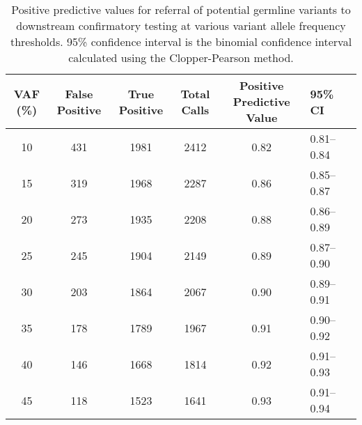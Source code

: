 
\begin{table}[H]
\caption[Positive predictive values for referral of potential germline variants to downstream confirmatory testing at various variant allele frequency thresholds.]{Positive predictive values for referral of potential germline variants to downstream confirmatory testing at various variant allele frequency thresholds. 95\% confidence interval is the binomial confidence interval calculated using the Clopper-Pearson method.}
\label{tbl:ppv}
\centering
      \begin{tabular}{cccccll}
        \hline
        VAF (\%) & False Positive & True Positive & Total Calls & Positive Predictive Value & 95\% CI
        \\
        \hline
        10 & 431 & 1981 & 2412 & 0.82 & 0.81--0.84
        \\
        15 & 319 & 1968 & 2287 & 0.86 & 0.85--0.87
        \\
        20 & 273 & 1935 & 2208 & 0.88 & 0.86--0.89
        \\
        25 & 245 & 1904 & 2149 & 0.89 & 0.87--0.90
        \\
        30 & 203 & 1864 & 2067 & 0.90 & 0.89--0.91
        \\
        35 & 178 & 1789 & 1967 & 0.91 & 0.90--0.92
        \\
        40 & 146 & 1668 & 1814 & 0.92 & 0.91--0.93
        \\
        45 & 118 & 1523 & 1641 & 0.93 & 0.91--0.94
        \\
				\hline
      \end{tabular} \\
\end{table}



\endinput

we were not only able to achieve sensitivity of 0.99, but also a positive predictive value of 0.86. This also meant that approximately 6\% of true germline variants would be overlooked and close to 10\% of calls predicted as potential germline variants would be somatic mutations. The lower bounds of the confidence intervals for sensitivity at VAF cut-offs of 20\%, 25\%, and 30\% were 0.97, 0.95, and 0.93, respectively, whereas the lower bounds of the confidence intervals for PPV were 0.86, 0.87, and 0.89, respectively. By taking into account margins of errors, selecting a VAF threshold of 30\% would provide the best trade-off between sensitivity and PPV. At the 30\% VAF cut-off, we were not only able to achieve sensitivity of 0.94, but also a positive predictive value of 0.90. This also meant that approximately 6\% of true germline variants would be overlooked and close to 10\% of calls predicted as potential germline variants would be somatic mutations.

